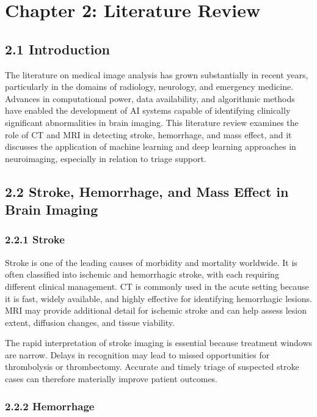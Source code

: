 \documentclass[12pt,a4paper]{report}
\begin{document}
\chapter{Chapter 2: Literature Review}

\section{2.1 Introduction}

The literature on medical image analysis has grown substantially in recent years, particularly in the domains of radiology, neurology, and emergency medicine. Advances in computational power, data availability, and algorithmic methods have enabled the development of AI systems capable of identifying clinically significant abnormalities in brain imaging. This literature review examines the role of CT and MRI in detecting stroke, hemorrhage, and mass effect, and it discusses the application of machine learning and deep learning approaches in neuroimaging, especially in relation to triage support.

\section{2.2 Stroke, Hemorrhage, and Mass Effect in Brain Imaging}

\subsection{2.2.1 Stroke}

Stroke is one of the leading causes of morbidity and mortality worldwide. It is often classified into ischemic and hemorrhagic stroke, with each requiring different clinical management. CT is commonly used in the acute setting because it is fast, widely available, and highly effective for identifying hemorrhagic lesions. MRI may provide additional detail for ischemic stroke and can help assess lesion extent, diffusion changes, and tissue viability.

The rapid interpretation of stroke imaging is essential because treatment windows are narrow. Delays in recognition may lead to missed opportunities for thrombolysis or thrombectomy. Accurate and timely triage of suspected stroke cases can therefore materially improve patient outcomes.

\subsection{2.2.2 Hemorrhage}
\end{document}
